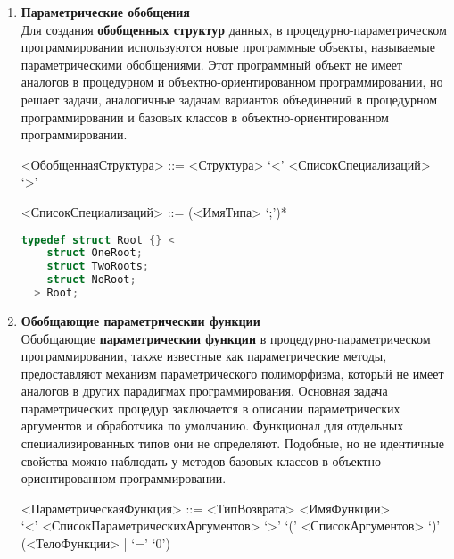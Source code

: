 \begin{enumerate}
  \item \textbf{Параметрические обобщения} \\
    Для создания \textbf{обобщенных структур} данных, в процедурно-параметрическом программировании используются новые программные объекты, называемые параметрическими обобщениями.
    Этот программный объект не имеет аналогов в процедурном и объектно-ориентированном программировании, но решает задачи, аналогичные задачам вариантов объединений в процедурном программировании и базовых классов в объектно-ориентированном программировании.

  \begin{centerframebox}
    \small
    \begin{grammar}
      <ОбобщеннаяСтруктура> ::= <Структура> `<' <СписокСпециализаций> `>'

      <СписокСпециализаций> ::= (<ИмяТипа> `;')*
    \end{grammar}
  \end{centerframebox}

\begin{lstlisting}[language=c, caption={Пример параметрического обобщения}, label={lst:fancystruct}]
  typedef struct Root {} <
    struct OneRoot;
    struct TwoRoots;
    struct NoRoot;
  > Root;
\end{lstlisting}

  \item \textbf{Обобщающие параметрическии функции} \\
    Обобщающие \textbf{параметрическии функции} в процедурно-параметрическом программировании, также известные как параметрические методы, предоставляют механизм параметрического полиморфизма, который не имеет аналогов в других парадигмах программирования.
    Основная задача параметрических процедур заключается в описании параметрических аргументов и обработчика по умолчанию.
    Функционал для отдельных специализированных типов они не определяют.
    Подобные, но не идентичные свойства можно наблюдать у методов базовых классов в объектно-ориентированном программировании.

  \begin{centerframebox}
    \small
    \begin{grammar}
      <ПараметрическаяФункция> ::= <ТипВозврата> <ИмяФункции> \\
      `<' <СписокПараметрическихАргументов> `>' `(' <СписокАргументов> `)' \\
      (<ТелоФункции> | `=' `0')


\end{grammar}
\end{centerframebox}
\end{enumerate}
